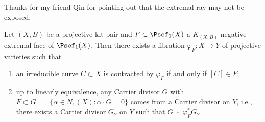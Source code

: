    \begin{remark}\label{rmk:extremal_ray_may_not_be_exposed}
        Thanks for my friend Qin for pointing out that the extremal ray may not be exposed.
    \end{remark}


    \begin{theorem}\label{thm: contraction theorem}
        Let \((X,B)\) be a projective klt pair and \(F \subset \Psef_1(X)\) a \(K_{(X,B)}\)-negative extremal face of \(\Psef_1(X)\).
        Then there exists a fibration \(\varphi_F: X \to Y\) of projective varieties such that
        \begin{enumerate}
            \item an irreducible curve \(C \subset X\) is contracted by \(\varphi_F\) if and only if \([C] \in F\);
            \item up to linearly equivalence, any Cartier divisor \(G\) with \(F \subset G^{\perp} = \{\alpha \in N_1(X) : \alpha \cdot G= 0\}\) comes from a Cartier divisor on \(Y\),
                i.e., there exists a Cartier divisor \(G_Y\) on \(Y\) such that \(G \sim \varphi_F^* G_Y\).
        \end{enumerate}
    \end{theorem}
